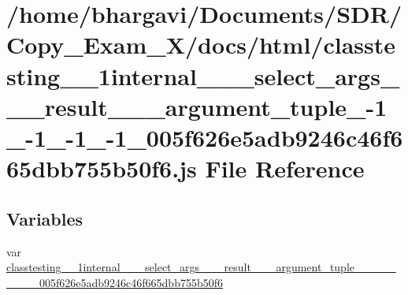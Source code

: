 \hypertarget{classtesting__1__1internal__1__1__select__args__3__01__result__00__01__argument__tuple__00-1__001b1b64c805498286faa21b1f0c199778}{}\section{/home/bhargavi/\+Documents/\+S\+D\+R/\+Copy\+\_\+\+Exam\+\_\+X/docs/html/classtesting\+\_\+\_\+1internal\+\_\+\_\+\_\+select\+\_\+args\+\_\+\_\+\_\+result\+\_\+\_\+\_\+argument\+\_\+tuple\+\_-\/1\+\_-\/1\+\_-\/1\+\_-\/1\+\_\+005f626e5adb9246c46f665dbb755b50f6.js File Reference}
\label{classtesting__1__1internal__1__1__select__args__3__01__result__00__01__argument__tuple__00-1__001b1b64c805498286faa21b1f0c199778}
\subsection*{Variables}
\begin{DoxyCompactItemize}
\item 
var \hyperlink{classtesting__1__1internal__1__1__select__args__3__01__result__00__01__argument__tuple__00-1__001b1b64c805498286faa21b1f0c199778_a00aa81c116f255162f9d0946e8e1a4f4}{classtesting\+\_\+\_\+1internal\+\_\+\_\+\_\+select\+\_\+args\+\_\+\_\+\_\+result\+\_\+\_\+\_\+argument\+\_\+tuple\+\_\+\_\+\_\+\_\+\_\+\_\+\_\+\_\+\_\+005f626e5adb9246c46f665dbb755b50f6}
\end{DoxyCompactItemize}


